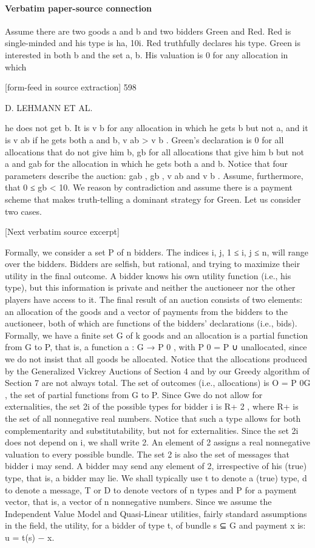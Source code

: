 \documentclass[10pt]{article}
\begin{document}
\paragraph{Verbatim paper-source connection}
\begin{ReviewVerbatim}
Assume there are two goods a and b and two bidders Green and Red. Red is
single-minded and his type is h{a}, 10i. Red truthfully declares his type. Green is
interested in both b and the set {a, b}. His valuation is 0 for any allocation in which


[form-feed in source extraction]
598

D. LEHMANN ET AL.

he does not get b. It is v b for any allocation in which he gets b but not a, and it
is v ab if he gets both a and b, v ab > v b . Green’s declaration is 0 for all allocations
that do not give him b, gb for all allocations that give him b but not a and gab for
the allocation in which he gets both a and b. Notice that four parameters describe
the auction: gab , gb , v ab and v b . Assume, furthermore, that 0 ≤ gb < 10. We reason
by contradiction and assume there is a payment scheme that makes truth-telling a
dominant strategy for Green. Let us consider two cases.

[Next verbatim source excerpt]

Formally, we consider a set P of n bidders. The indices i, j, 1 ≤ i, j ≤ n, will
range over the bidders. Bidders are selfish, but rational, and trying to maximize their
utility in the final outcome. A bidder knows his own utility function (i.e., his type),
but this information is private and neither the auctioneer nor the other players have
access to it. The final result of an auction consists of two elements: an allocation
of the goods and a vector of payments from the bidders to the auctioneer, both of
which are functions of the bidders’ declarations (i.e., bids). Formally, we have a
finite set G of k goods and an allocation is a partial function from G to P, that is, a
function a : G → P 0 , with P 0 = P ∪ {unallocated}, since we do not insist that all
goods be allocated. Notice that the allocations produced by the Generalized Vickrey
Auctions of Section 4 and by our Greedy algorithm of Section 7 are not always
total. The set of outcomes (i.e., allocations) is O = P 0G , the set of partial functions
from G to P. Since Gwe do not allow for externalities, the set 2i of the possible types
for bidder i is R+ 2 , where R+ is the set of all nonnegative real numbers. Notice
that such a type allows for both complementarity and substitutability, but not for
externalities. Since the set 2i does not depend on i, we shall write 2. An element
of 2 assigns a real nonnegative valuation to every possible bundle. The set 2 is
also the set of messages that bidder i may send. A bidder may send any element of
2, irrespective of his (true) type, that is, a bidder may lie. We shall typically use t
to denote a (true) type, d to denote a message, T or D to denote vectors of n types
and P for a payment vector, that is, a vector of n nonnegative numbers.
Since we assume the Independent Value Model and Quasi-Linear utilities, fairly
standard assumptions in the field, the utility, for a bidder of type t, of bundle s ⊆ G
and payment x is:
u = t(s) − x.


\end{ReviewVerbatim}
\end{document}
